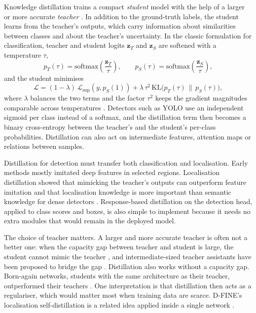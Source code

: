 \documentclass[a4paper,11pt,twoside]{report}
\theoremstyle{definition}
\begin{document}
Knowledge distillation trains a compact \emph{student} model with the help of a larger or more accurate \emph{teacher} \cite{Hinton2015Distilling}. In addition to the ground-truth labels, the student learns from the teacher's outputs, which carry information about similarities between classes and about the teacher's uncertainty. In the classic formulation for classification, teacher and student logits $\mathbf{z}_T$ and $\mathbf{z}_S$ are softened with a temperature $\tau$,
\begin{equation}
p_T(\tau) = \mathrm{softmax}\!\left(\frac{\mathbf{z}_T}{\tau}\right),
\qquad
p_S(\tau) = \mathrm{softmax}\!\left(\frac{\mathbf{z}_S}{\tau}\right),
\label{eq:kd_softmax_temp}
\end{equation}
and the student minimises
\begin{equation}
\mathcal{L} = (1-\lambda)\,\mathcal{L}_{\text{sup}}(y, p_S(1))
+ \lambda\,\tau^2\,\mathrm{KL}\!\big(p_T(\tau)\,\|\,p_S(\tau)\big),
\label{eq:kd_loss}
\end{equation}
where $\lambda$ balances the two terms and the factor $\tau^2$ keeps the gradient magnitudes comparable across temperatures \cite{Hinton2015Distilling}. Detectors such as YOLO use an independent sigmoid per class instead of a softmax, and the distillation term then becomes a binary cross-entropy between the teacher's and the student's per-class probabilities. Distillation can also act on intermediate features, attention maps or relations between samples.

Distillation for detection must transfer both classification and localisation. Early methods mostly imitated deep features in selected regions. Localisation distillation showed that mimicking the teacher's outputs can outperform feature imitation and that localisation knowledge is more important than semantic knowledge for dense detectors \cite{Zheng2022LD}. Response-based distillation on the detection head, applied to class scores and boxes, is also simple to implement because it needs no extra modules that would remain in the deployed model.

The choice of teacher matters. A larger and more accurate teacher is often not a better one: when the capacity gap between teacher and student is large, the student cannot mimic the teacher \cite{Cho2019Efficacy}, and intermediate-sized teacher assistants have been proposed to bridge the gap \cite{Mirzadeh2020TA}. Distillation also works without a capacity gap. Born-again networks, students with the same architecture as their teacher, outperformed their teachers \cite{Furlanello2018BAN}. One interpretation is that distillation then acts as a regulariser, which would matter most when training data are scarce. D-FINE's localisation self-distillation is a related idea applied inside a single network \cite{Peng2024DFINE}.
\end{document}
